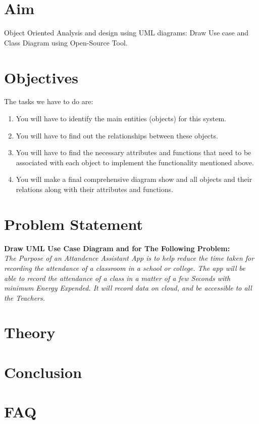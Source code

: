 \documentclass[11pt]{article}
\begin{document}
\tableofcontents
\thispagestyle{empty}
\clearpage

\setcounter{page}{1}

\section{Aim}
Object Oriented Analysis and design using UML diagrams: Draw Use case and Class
Diagram using Open-Source Tool.

\section{Objectives}

The tasks we have to do are:
\begin{enumerate}
    \item You will have to identify the main entities (objects) for this system.
    \item You will have to find out the relationships between these objects.
    \item You will have to find the necessary attributes and functions that need to be associated
    with each object to implement the functionality mentioned above.
    \item You will make a final comprehensive diagram show and all objects and their relations
    along with their attributes and functions.
\end{enumerate}


\section{Problem Statement}

\textbf{Draw UML Use Case Diagram and for The Following Problem:} \\

\textit{The Purpose of an Attandence Assistant App is to help reduce the time taken for recording the attendance of a classroom in a school or college. The app will be able to record the attendance of a class in a matter of a few Seconds with minimum Energy Expended. It will record data on cloud, and be accessible to all the Teachers.}\\

\section{Theory}


\section{Conclusion}

\section{FAQ}

\begin{enumerate}

\end{enumerate}
\end{document}
